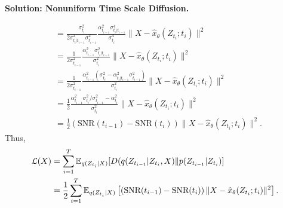 \documentclass[12pt]{article}
\begin{document}
\begin{enumerate}
\begin{solution}{\bf Solution: Nonuniform Time Scale Diffusion.}
\begin{enumerate}
\[\begin{aligned}
        &=\frac{\sigma_{t_i}^2}{2\sigma^2_{t_i|t_{i-1}}\sigma^2_{t_{i-1}}}\frac{\alpha^2_{t_{i-1}}\sigma_{t_i|t_{i-1}}^4}{\sigma_{t_i}^4}\|X-\hat{x}_\theta(Z_{t_i};t_i)\|^2\\&=\frac{1}{2\sigma^2_{t_{i-1}}}\frac{\alpha^2_{t_{i-1}}\sigma_{t_i|t_{i-1}}^2}{\sigma^2_{t_i}}\|X-\hat{x}_\theta(Z_{t_i};t_i)\|^2\\&=\frac{1}{2\sigma^2_{t_{i-1}}}\frac{\alpha^2_{t_{i-1}}(\sigma_{t_i}^2-\alpha^2_{t_i|t_{i-1}}\sigma^2_{t_{i-1}})}{\sigma^2_{t_i}}\|X-\hat{x}_\theta(Z_{t_i};t_i)\|^2\\&=\frac{1}{2}\frac{\alpha^2_{t_{i-1}}\sigma_{t_i}^2/\sigma^2_{t_{i-1}}-\alpha^2_{t_i}}{\sigma^2_{t_i}}\|X-\hat{x}_\theta(Z_{t_i};t_i)\|^2\\&=\frac12\left(\text{SNR}(t_{i-1})-\text{SNR}(t_i)\right)\|X-\hat{x}_\theta(Z_{t_i};t_i)\|^2.
    \end{aligned} \]
    Thus, 
    \[
    \begin{aligned}\mathcal{L}(X) &=  \sum_{i=1}^T \mathbb{E}_{q(Z_{t_i}|X)}[D(q(Z_{t_{i-1}}|Z_{t_i}, X)\| p(Z_{t_{i-1}}|Z_{t_i})]\\&=\frac12\sum_{i=1}^T\mathbb{E}_{q(Z_{t_i}|X)}\left[\left(\text{SNR}(t_{i-1})-\text{SNR}(t_i)\right)\|X-\hat{x}_\theta(Z_{t_i};t_i)\|^2\right].
    \end{aligned}
    \]
\end{enumerate}
\end{solution}


\begin{problem}
    \newpage~\newpage
\end{problem}


\end{enumerate}
\end{document}
